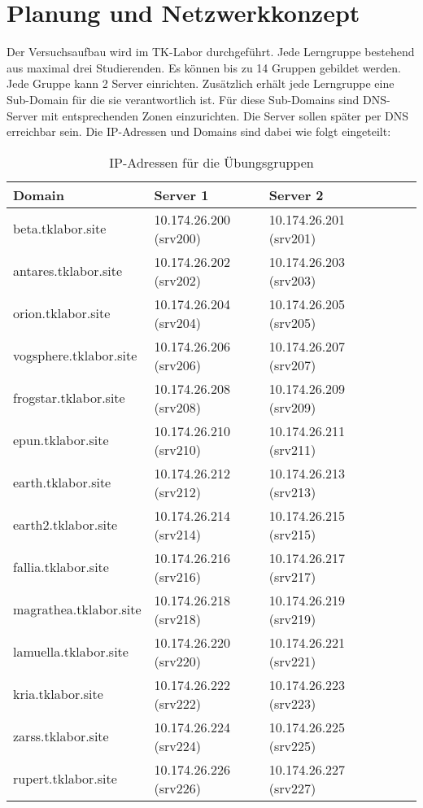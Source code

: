\section{Planung und Netzwerkkonzept}
Der Versuchsaufbau wird im TK-Labor durchgeführt. Jede Lerngruppe
bestehend aus maximal drei Studierenden. Es können bis zu 14 Gruppen gebildet
werden. Jede Gruppe kann 2 Server einrichten. Zusätzlich erhält jede Lerngruppe
eine Sub-Domain für die sie verantwortlich ist. Für diese Sub-Domains sind DNS-Server mit entsprechenden
Zonen einzurichten. Die Server sollen später per DNS erreichbar sein. Die
IP-Adressen und Domains sind dabei wie folgt eingeteilt:

\begin{table}[!h]
  \centering
  \begin{tabular}{l l l l l l}
	\hline
	\textbf{Domain} & \textbf{Server 1} & \textbf{Server 2} \\
	\hline
	beta.tklabor.site & 10.174.26.200 (srv200) & 10.174.26.201 (srv201) \\
	antares.tklabor.site & 10.174.26.202 (srv202) & 10.174.26.203 (srv203) \\
	\hline
	orion.tklabor.site & 10.174.26.204 (srv204) & 10.174.26.205 (srv205) \\
	vogsphere.tklabor.site & 10.174.26.206 (srv206) & 10.174.26.207 (srv207) \\
	\hline
	frogstar.tklabor.site & 10.174.26.208 (srv208) & 10.174.26.209 (srv209) \\
	epun.tklabor.site & 10.174.26.210 (srv210) & 10.174.26.211 (srv211) \\
	\hline
	earth.tklabor.site & 10.174.26.212 (srv212) & 10.174.26.213 (srv213) \\
	earth2.tklabor.site & 10.174.26.214 (srv214) & 10.174.26.215 (srv215) \\
	\hline
	fallia.tklabor.site & 10.174.26.216 (srv216) & 10.174.26.217 (srv217) \\
	magrathea.tklabor.site & 10.174.26.218 (srv218) & 10.174.26.219 (srv219) \\
	\hline
	lamuella.tklabor.site & 10.174.26.220 (srv220) & 10.174.26.221 (srv221) \\
	kria.tklabor.site & 10.174.26.222 (srv222) & 10.174.26.223 (srv223) \\
	\hline
	zarss.tklabor.site & 10.174.26.224 (srv224) & 10.174.26.225 (srv225) \\
	rupert.tklabor.site & 10.174.26.226 (srv226) & 10.174.26.227 (srv227) \\
	\end{tabular}
	\caption{IP-Adressen für die Übungsgruppen}
	\label{tab:chap-labdocu-ipadressplan}
\end{table}

